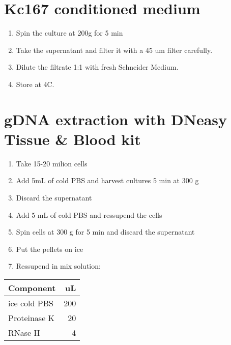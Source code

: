 \documentclass[11pt]{article}
\begin{document}
\section{Kc167 conditioned medium}
\label{sec:org2e788e6}
\begin{enumerate}
\item Spin the culture at 200g for 5 min\\
\item Take the supernatant and filter it with a 45 um filter carefully.\\
\item Dilute the filtrate 1:1 with fresh Schneider Medium.\\
\item Store at 4C.\\
\end{enumerate}

\section{gDNA extraction with DNeasy Tissue \& Blood kit}
\label{sec:org6b07f33}
\begin{enumerate}
\item Take 15-20 milion cells\\
\item Add 5mL of cold PBS and harvest cultures 5 min at 300 g\\
\item Discard the supernatant\\
\item Add 5 mL of cold PBS and ressupend the cells\\
\item Spin cells at 300 g for 5 min and discard the supernatant\\
\item Put the pellets on ice\\
\item Ressupend in mix solution:\\
\end{enumerate}
\begin{center}
\begin{tabular}{lr}
\hline
Component & uL\\
\hline
ice cold PBS & 200\\
Proteinase K & 20\\
RNase H & 4\\
\hline
\end{tabular}
\end{center}
\end{document}
